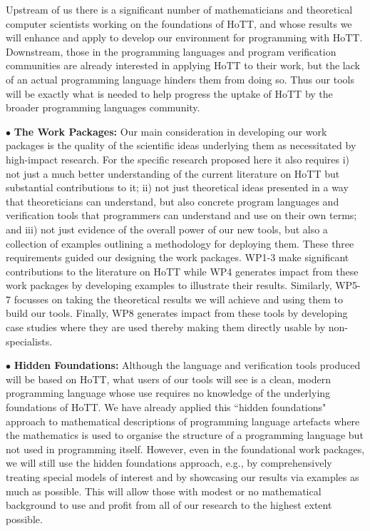 \documentclass[a4paper,11pt]{article}
\begin{document}
Upstream of us there is a significant number of mathematicians and
theoretical computer scientists working on the foundations of HoTT,
and whose results we will enhance and apply to develop our environment
for programming with HoTT. Downstream, those in the programming
languages and program verification communities are already interested
in applying HoTT to their work, but the lack of an actual programming
language hinders them from doing so. Thus our tools will be exactly
what is needed to help progress the uptake of HoTT by the broader
programming languages community. 

\vspace*{0.02in}

$\bullet$ {\bf The Work Packages:} Our main consideration in
developing our work packages is the quality of the scientific ideas
underlying them as necessitated by high-impact research.
For the specific research proposed here it also requires
i) not just a much better understanding of the current
literature on HoTT but substantial contributions to it; ii) not just
theoretical ideas presented in a way that theoreticians can
understand, but also concrete program languages and verification tools
that programmers can understand and use on their own terms; and iii)
not just evidence of the overall power of our new tools, but also a
collection of examples outlining a methodology for deploying them.
These three requirements guided our designing the work packages. WP1-3
make significant contributions to the literature on HoTT while WP4
generates impact from these work packages by developing examples to
illustrate their results. Similarly, WP5-7 focusses on taking the
theoretical results we will achieve and using them to build our
tools. Finally, WP8 generates impact from these tools by developing
case studies where they are used thereby making them
directly usable by non-specialists.  

\vspace*{0.02in}

$\bullet$ {\bf Hidden Foundations:} Although the language and
verification tools produced will be based on HoTT, what users of our
tools will see is a clean, modern programming language whose use
requires no knowledge of the underlying foundations of HoTT. We have
already applied this ``hidden foundations" approach to mathematical
descriptions of programming language artefacts where the mathematics
is used to organise the structure of a programming language but not
used in programming itself. However, even in the foundational work
packages, we will still use the hidden foundations approach, e.g., by
comprehensively treating special models of interest and by showcasing
our results via examples as much as possible. This will allow those
with modest or no mathematical background to use and profit from
all of our research to the highest extent possible.
\end{document}
